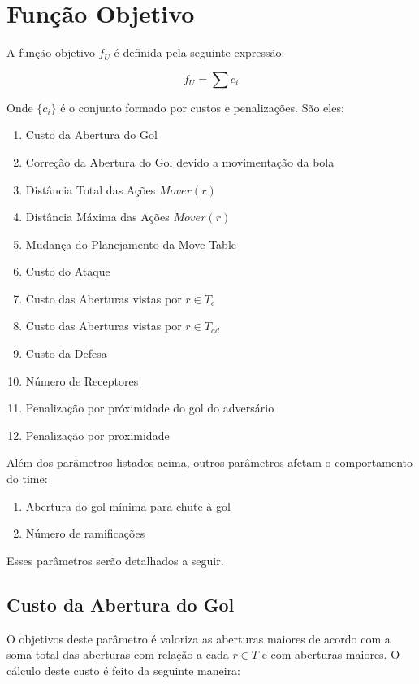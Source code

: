 \section{Função Objetivo}
A função objetivo $f_U$ é definida pela seguinte
expressão:

\begin{dmath}
  f_U = \sum c_i 
\end{dmath}

Onde $\lbrace c_i \rbrace$ é o conjunto formado
por custos e penalizações. São eles:
\begin{enumerate}
  \item Custo da Abertura do Gol
  \item Correção da Abertura do Gol devido a movimentação da bola
  \item Distância Total das Ações $Mover(r)$
  \item Distância Máxima das Ações $Mover(r)$
  \item Mudança do Planejamento da Move Table
  \item Custo do Ataque
  \item Custo das Aberturas vistas por $r \in T_c$
  \item Custo das Aberturas vistas por $r \in T_{ad}$
  \item Custo da Defesa
  \item Número de Receptores
  \item Penalização por próximidade do gol do adversário
  \item Penalização por proximidade
\end{enumerate}

Além dos parâmetros listados acima, outros parâmetros
afetam o comportamento do time:
\begin{enumerate}
  \item Abertura do gol mínima para chute à gol
  \item Número de ramificações
\end{enumerate}

Esses parâmetros serão detalhados a seguir.

\subsection{Custo da Abertura do Gol}\label{subsec:custo_gap}
O objetivos deste parâmetro é valoriza as aberturas maiores
de acordo com a soma total das aberturas com relação a cada
$r \in T$ e com aberturas maiores.
O cálculo deste custo é feito da seguinte maneira:

